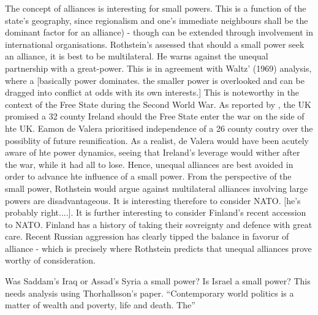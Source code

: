 \parencite{KEOHANE_1969,ROTHSTEIN_1966}  The concept of alliances is interesting for small powers. This is a function of the state's geography, since regionalism and one's immediate neighbours shall be the dominant factor for an alliance) - though can be extended through involvement in international organisations.    Rothstein's assessed that should a small power seek an alliance, it is best to be multilateral. He warns against the unequal partnership with a great-power. This is in agreement with Waltz' (1969) analysis, where a  [basically power dominates. the smaller power is overlooked and can be dragged into conflict at odds with its own interests.] This is noteworthy in the context of the Free State during the Second World War. As reported by \parencite{FANNING_2015}, the UK promised a 32 county Ireland should the Free State enter the war on the side of hte UK. Eamon de Valera prioritised independence of a 26 county coutry over the possiblity of future reunification. As a realist, de Valera would have been acutely aware of hte power dynamics, seeing that Ireland's leverage would wither after the war, while it had all to lose. Hence, unequal alliances are best avoided in order to advance hte influence of a small power. From the perspective of the small power, Rothstein would argue against multilateral alliances involving large powers are disadvantageous. It is interesting therefore to consider NATO. [he's probably right....]. It is further interesting to consider Finland's recent accession to NATO. Finland has a history of taking their sovreignty and defence with great care. Recent Russian aggression has clearly tipped the balance in favorur of alliance - which is precisely where Rothstein predicts that unequal alliances prove worthy of consideration.
                                                                                                                              
Was Saddam's Iraq or Assad's Syria a small power? Is Israel a small power? This needs analysis using Thorhallsson's paper.  \parencite{KEOHANE_1988} ``Contemporary world politics is a matter of wealth and poverty, life and death. The''

